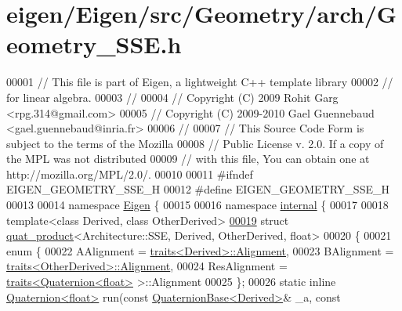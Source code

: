\hypertarget{eigen_2_eigen_2src_2_geometry_2arch_2_geometry___s_s_e_8h_source}{}\section{eigen/\+Eigen/src/\+Geometry/arch/\+Geometry\+\_\+\+S\+SE.h}
\label{eigen_2_eigen_2src_2_geometry_2arch_2_geometry___s_s_e_8h_source}

\begin{DoxyCode}
00001 \textcolor{comment}{// This file is part of Eigen, a lightweight C++ template library}
00002 \textcolor{comment}{// for linear algebra.}
00003 \textcolor{comment}{//}
00004 \textcolor{comment}{// Copyright (C) 2009 Rohit Garg <rpg.314@gmail.com>}
00005 \textcolor{comment}{// Copyright (C) 2009-2010 Gael Guennebaud <gael.guennebaud@inria.fr>}
00006 \textcolor{comment}{//}
00007 \textcolor{comment}{// This Source Code Form is subject to the terms of the Mozilla}
00008 \textcolor{comment}{// Public License v. 2.0. If a copy of the MPL was not distributed}
00009 \textcolor{comment}{// with this file, You can obtain one at http://mozilla.org/MPL/2.0/.}
00010 
00011 \textcolor{preprocessor}{#ifndef EIGEN\_GEOMETRY\_SSE\_H}
00012 \textcolor{preprocessor}{#define EIGEN\_GEOMETRY\_SSE\_H}
00013 
00014 \textcolor{keyword}{namespace }\hyperlink{namespace_eigen}{Eigen} \{ 
00015 
00016 \textcolor{keyword}{namespace }\hyperlink{namespaceinternal}{internal} \{
00017 
00018 \textcolor{keyword}{template}<\textcolor{keyword}{class} Derived, \textcolor{keyword}{class} OtherDerived>
\hyperlink{struct_eigen_1_1internal_1_1quat__product_3_01_architecture_1_1_s_s_e_00_01_derived_00_01_other_derived_00_01float_01_4}{00019} \textcolor{keyword}{struct }\hyperlink{struct_eigen_1_1internal_1_1quat__product}{quat\_product}<Architecture::SSE, Derived, OtherDerived, float>
00020 \{
00021   \textcolor{keyword}{enum} \{
00022     AAlignment = \hyperlink{struct_eigen_1_1internal_1_1traits}{traits<Derived>::Alignment},
00023     BAlignment = \hyperlink{struct_eigen_1_1internal_1_1traits}{traits<OtherDerived>::Alignment},
00024     ResAlignment = \hyperlink{struct_eigen_1_1internal_1_1traits}{traits<Quaternion<float>} >::Alignment
00025   \};
00026   \textcolor{keyword}{static} \textcolor{keyword}{inline} \hyperlink{group___geometry___module_class_eigen_1_1_quaternion}{Quaternion<float>} run(\textcolor{keyword}{const} 
      \hyperlink{group___geometry___module_class_eigen_1_1_quaternion_base}{QuaternionBase<Derived>}& \_a, \textcolor{keyword}{const} 

\end{DoxyCode}
